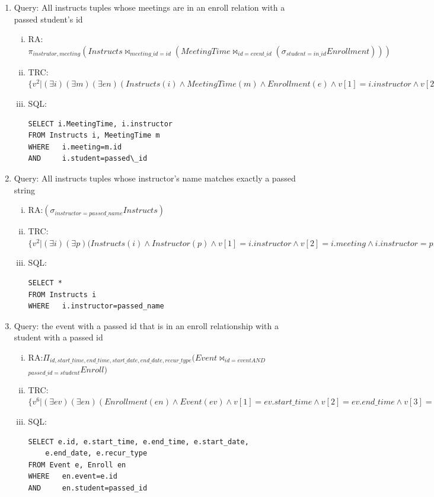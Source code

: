 \documentclass[pdftex,12pt,letter]{article}
\begin{document}
\begin{enumerate}[1.]
\begin{enumerate}[i.]
\begin{verbatim}
AND		(c.dept LIKE '%input_dept%'
	 	OR c.number = input_number
	 	OR c.classname LIKE '%input_name%')
\end{verbatim}
\end{enumerate}
\item Query: All instructs tuples whose meetings are in an enroll relation with a
passed student's id
\begin{enumerate}[i.]
\item RA: $ \pi_{instrutor, meeting} (Instructs \bowtie_{meeting\_id=id} (MeetingTime \bowtie_{id=event\_id}(\sigma_{student=in\_id} Enrollment)))$
\item TRC: $\{v^2\vert(\exists i)(\exists m)(\exists en)(Instructs(i) \wedge MeetingTime(m) \wedge Enrollment(e) \wedge v[1]=i.instructor \wedge v[2]=i.meeting \wedge i.meeting=m.id \wedge en.student=input\_id \wedge en.event=m.id)\}$
\item SQL:
\begin{verbatim}
SELECT i.MeetingTime, i.instructor
FROM Instructs i, MeetingTime m
WHERE 	i.meeting=m.id
AND		i.student=passed\_id
\end{verbatim}
\end{enumerate}
\item Query: All instructs tuples whose instructor's name matches exactly a passed string
\begin{enumerate}[i.]
\item RA:$(\sigma_{instructor=passed\_name}Instructs)$
\item TRC: $\{v^2\vert(\exists i)(\exists p)(Instructs(i) \wedge Instructor(p) \wedge v[1]=i.instructor \wedge v[2]=i.meeting \wedge i.instructor=p.name \wedge p.name=input\_name\} $
\item SQL:
\begin{verbatim}
SELECT *
FROM Instructs i
WHERE 	i.instructor=passed_name
\end{verbatim}
\end{enumerate}
\item Query: the event with a passed id that is in an enroll relationship with a
student with a passed id
\begin{enumerate}[i.]
\item RA:$\Pi_{id, start\_time, end\_time, start\_date, end\_date, recur\_type}(Event\bowtie_{id = event AND}$\\$_{passed\_id = student}Enroll)$
\item TRC: $\{v^6 \vert (\exists ev)(\exists en)(Enrollment(en) \wedge Event(ev) \wedge v[1]=ev.start\_time \wedge v[2]=ev.end\_time \wedge v[3]=ev.start\_date \wedge v[4].ev.end\_date \wedge v[5]=ev.recur\_type \wedge v[6]=ev.id \wedge en.event = ev.id \wedge en.student=input\_case\_id \wedge ev.id=\wedge input\_event\_id)\}$
\item SQL:
\begin{verbatim}
SELECT e.id, e.start_time, e.end_time, e.start_date,
    e.end_date, e.recur_type
FROM Event e, Enroll en
WHERE 	en.event=e.id
AND		en.student=passed_id
\end{verbatim}
\end{enumerate}
\end{enumerate}
\end{document}
